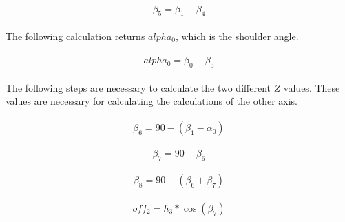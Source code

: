 \documentclass{article}
\begin{document}
    \paragraph{}
    \begin{equation}
        \beta_5 = \beta_1 - \beta_4
    \end{equation}

    \paragraph{}
    The following calculation returns $alpha_0$, which is the shoulder angle. 

    \paragraph{}
    \begin{equation}
        alpha_0 = \beta_0 - \beta_5
    \end{equation}

    \paragraph{}
    The following steps are necessary to calculate the two different $Z$ values. These values are necessary for calculating the calculations of the other axis.

    \paragraph{}
    \begin{equation}
        \beta_6 = 90 - (\beta_1 - \alpha_0)
    \end{equation}

    \paragraph{}
    \begin{equation}
        \beta_7 = 90 - \beta_6
    \end{equation}

    \paragraph{}
    \begin{equation}
        \beta_8 = 90 - (\beta_6 + \beta_7)
    \end{equation}

    \paragraph{}
    \begin{equation}
        off_2 = h_3 * \cos(\beta_7)
    \end{equation}
\end{document}
